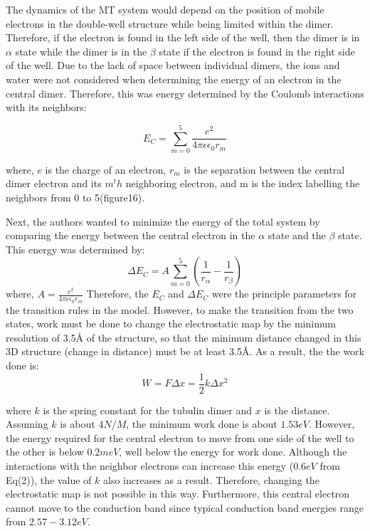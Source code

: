 \documentclass[letterpaper,final,times]{cas-dc}
\numberwithin{equation}{section}
\begin{document}
The dynamics of the MT system would depend on the position of mobile electrons in the double-well structure while being limited within the dimer. Therefore, if the electron is found in the left side of the well, then the dimer is in $\alpha$ state while the dimer is in the $\beta$ state if the electron is found in the right side of the well\citep{92}. Due to the lack of space between individual dimers, the ions and water were not considered when determining the energy of an electron in the central dimer. Therefore, this was energy determined by the Coulomb interactions with its neighbors:

\begin{equation}
E_C = \sum_{m=0}^{5}\frac{e^2}{4\pi\epsilon\epsilon_0r_m}
\end{equation}

where, $e$ is the charge of an electron, $r_m$ is the separation between the central dimer electron and its $m^th$ neighboring electron, and m is the index labelling the neighbors from 0 to 5(figure16).

Next, the authors wanted to minimize the energy of the total system by comparing the energy between the central electron in the $\alpha$ state and the $\beta$ state. This energy was determined by:
\begin{equation}
    \Delta E_C = A \sum_{m=0}^{5}(\frac{1}{r_\alpha}-\frac{1}{r_\beta})
\end{equation}
where, $A=\frac{e^2}{4\pi\epsilon\epsilon_0r_m}$ Therefore, the $E_C$ and $\Delta E_C$ were the principle parameters for the transition rules in the \citet{92} model. However, to make the transition from the two states, work must be done to change the electrostatic map by the minimum resolution of 3.5Å of the structure, so that the minimum distance changed in this 3D structure (change in distance) must be at least 3.5Å. As a result, the the work done is:
\begin{equation}
    W = F\Delta x
      = \frac{1}{2}k \Delta x^2
\end{equation}

where $k$ is the spring constant for the tubulin dimer and $x$ is the distance. Assuming $k$ is about $4N/M$\citep{93}, the minimum work done is about $1.53eV$. However, the energy required for the central electron to move from one side of the well to the other is below $0.2meV$\citep{94}, well below the energy for work done. Although the interactions with the neighbor electrons can increase this energy ($0.6eV$ from Eq(2)), the value of $k$ also increases as a result. Therefore, changing the electrostatic map is not possible in this way. Furthermore, this central electron cannot move to the conduction band since typical conduction band energies range from $2.57-3.12eV$\citep{92}.
\end{document}
